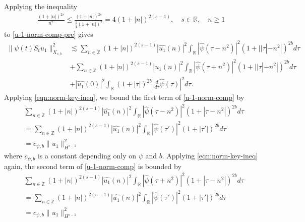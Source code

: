 \documentclass[12pt,reqno]{amsart}
\numberwithin{equation}{section}  %
\numberwithin{figure}{section}
\newcommand{\rr}{\mathbb{R}}
\newcommand{\zz}{\mathbb{Z}}
\newcommand{\wh}{\widehat}
\theoremstyle{plain}
\theoremstyle{definition}
\theoremstyle{remark}
\begin{document}
%
%
Applying the inequality
%
%
\begin{equation*}
\begin{split}
  \frac{(1 + |n|)^{2s}}{ n^{2}} \le \frac{(1 + |n|)^{2s}}{\frac{1}{4}(1 +
  |n|)^{2}} = 4 (1 + | n |)^{2(s-1)},  \quad s \in \rr, \quad n \ge 1
\end{split}
\end{equation*}
%
to \eqref{u-1-norm-comp-pre} gives
%
\begin{equation}
  \begin{split}
    \| \psi(t) S_{t}u_{1} \|_{X_{s,b}}^{2} 
    & \lesssim \sum_{n \in \dot{\zz}} \left( 1 + |n| \right)^{2(s-1)} | \wh{u_{1}}(n)
    |^{2} \int_{\rr} | \wh{\psi}(\tau - n^{2}) |^{2}\left( 1 + | | \tau | -
    n^{2} | \right)^{2b} d \tau
    \\
    & + \sum_{n \in \dot{\zz}} \left( 1 + |n| \right)^{2(s-1)} | \wh{u_{1}}(n)
    |^{2} \int_{\rr} | \wh{\psi}(\tau + n^{2}) |^{2}\left( 1 + | | \tau | -
    n^{2} | \right)^{2b} d \tau
    \\
    & + |\wh{u_{1}}(0)|^{2} \int_{\rr} (1 + | \tau |)^{2b} |\frac{d }{d \tau}
    \wh{\psi}(\tau)|^2 d \tau.
\end{split}
\label{u-1-norm-comp}
\end{equation}
%
%
Applying \eqref{eqn:norm-key-ineq},
we bound the first term of
\eqref{u-1-norm-comp} by
%
%
%
\begin{equation*}
  \begin{split}
    & \sum_{n \in \dot{\zz}} \left( 1 + |n| \right)^{2(s-1)} | \wh{u_{1}}(n)
    |^{2} \int_{\rr} | \wh{\psi}(\tau - n^{2}) |^{2}\left( 1 +  | \tau  -
    n^{2} | \right)^{2b} d \tau
    \\
    & = \sum_{n \in \dot{\zz}} \left( 1 + |n| \right)^{2(s-1)} | \wh{u_{1}}(n)
    |^{2} \int_{\rr} | \wh{\psi}(\tau') |^{2}\left( 1 +  | \tau'| \right)^{2b} d \tau
    \\
    & = c_{\psi, b} \| u_{1} \|_{H^{s-1}}^{2}
  \end{split}
\end{equation*}
%
%
where $c_{\psi, b}$ is a constant depending only on $\psi$ and $b$. Applying
\eqref{eqn:norm-key-ineq} again, the
second term of \eqref{u-1-norm-comp} is bounded by
\begin{equation*}
  \begin{split}
    & \sum_{n \in \dot{\zz}} \left( 1 + |n| \right)^{2(s-1)} | \wh{u_{1}}(n)
    |^{2} \int_{\rr} | \wh{\psi}(\tau + n^{2}) |^{2}\left( 1 +  | \tau  -
    n^{2} | \right)^{2b} d \tau
    \\
    & = \sum_{n \in \dot{\zz}} \left( 1 + |n| \right)^{2(s-1)} | \wh{u_{1}}(n)
    |^{2} \int_{\rr} | \wh{\psi}(\tau') |^{2}\left( 1 +  | \tau'| \right)^{2b} d \tau
    \\
    & = c_{\psi, b} \| u_{1} \|_{H^{s-1}}^{2}
  \end{split}
\end{equation*}
\end{document}
